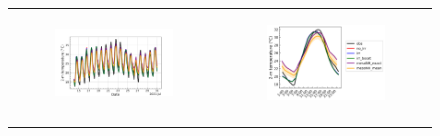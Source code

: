 \begin{figure}[hbtp]
    \centering
    \begin{tabular}{cc}
        \begin{subfigure}[t]{0.5\textwidth}
            \caption{}
            \includegraphics[width=\textwidth]{images/chap5/time_series_elsplans_t2m.png}
        \end{subfigure} &
        \begin{subfigure}[t]{0.5\textwidth}
            \caption{}
            \includegraphics[width=\textwidth]{images/chap5/diurnal_cycle_elsplans_t2m.png}
        \end{subfigure} \\
        
        \vspace{1em} %


\end{tabular}
\end{figure}
